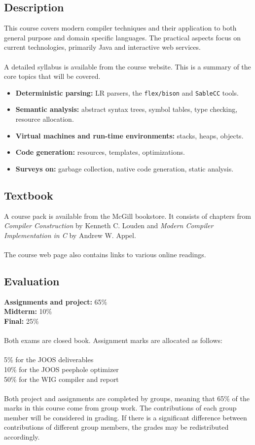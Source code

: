 \documentclass{article}
\begin{document}
\subsection*{Description}
This course covers modern compiler techniques and their application to both
general purpose and domain specific languages. The practical aspects focus on
current technologies, primarily Java and interactive web services. \\ \\
A detailed syllabus is available from the course website. This is a summary
of the core topics that will be covered.

\begin{itemize}
\item \textbf{Deterministic parsing:} LR parsers, the {\tt flex/bison} and
 	   {\tt SableCC} tools.
\item \textbf{Semantic analysis:} abstract syntax trees, symbol tables, type
	   checking, resource allocation.
\item \textbf{Virtual machines and run-time environments:} stacks, heaps, objects.
\item \textbf{Code generation:} resources, templates, optimizations.
\item \textbf{Surveys on:} garbage collection, native code generation, static
      analysis.
\end{itemize}

\subsection*{Textbook}
A course pack is available from the McGill bookstore. It consists of chapters from
\emph{Compiler Construction} by Kenneth C. Louden and
\emph{Modern Compiler Implementation in C} by Andrew W. Appel. \\ \\
The course web page also contains links to various online readings.

\subsection*{Evaluation}
\textbf{Assignments and project:} 65\% \\
\textbf{Midterm:} 10\% \\
\textbf{Final:} 25\% \\ \\
Both exams are closed book.
Assignment marks are allocated as follows: \\ \\
5\% for the JOOS deliverables \\
10\% for the JOOS peephole optimizer \\
50\% for the WIG compiler and report \\ \\
Both project and assignments are completed by groups, meaning that 65\% of the
marks in this course come from group work. The contributions of each group
member will be considered in grading. If there is a significant difference
between contributions of different group members, the grades may be
redistributed accordingly.
\end{document}
